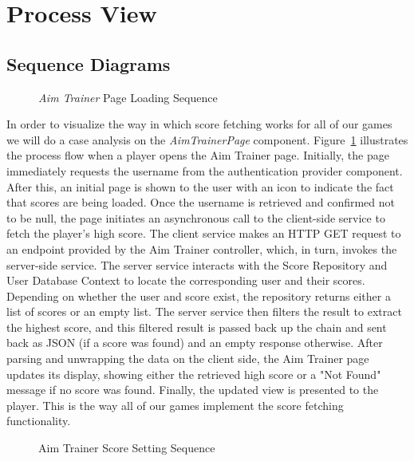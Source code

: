 \documentclass[11pt,a4paper]{article}
\newcommand{\inputdiagram}[1]{}
\begin{document}
\section{Process View}

\subsection{Sequence Diagrams}

\begin{figure}[H]
    \centering
     \begin{adjustbox}{width=0.92\paperwidth,center}
         \inputdiagram{aim_trainer_page_sequence.tex}
     \end{adjustbox}
     \caption{\textit{Aim Trainer} Page Loading Sequence}
    \label{fig:aim_trainer_page_sequence}
\end{figure}
In order to visualize the way in which score fetching works for all of
our games we will do a case analysis on the \textit{AimTrainerPage} component.
Figure~\ref{fig:aim_trainer_page_sequence} illustrates the process flow
when a player opens the Aim Trainer page. Initially, the page immediately
requests the username from the authentication provider component. After
this, an initial page is shown to the user with an icon to indicate the fact
that scores are being loaded. Once the username is retrieved and confirmed
not to be null, the page initiates an asynchronous call to the client-side
service to fetch the player's high score. The client service makes an HTTP GET
request to an endpoint provided by the Aim Trainer controller, which, in turn,
invokes the server-side service. The server service interacts with the Score
Repository and User Database Context to locate the corresponding user and
their scores. Depending on whether the user and score exist, the repository
returns either a list of scores or an empty list. The server service then
filters the result to extract the highest score, and this filtered result
is passed back up the chain and sent back as JSON (if a score was found)
and an empty response otherwise. After parsing and unwrapping the data on
the client side, the Aim Trainer page updates its display, showing either the
retrieved high score or a "Not Found" message if no score was found. Finally,
the updated view is presented to the player. This is the way all of our
games implement the score fetching functionality.

\begin{figure}[H]
    \centering
     \begin{adjustbox}{width=0.92\paperwidth,center}
        \inputdiagram{aim_trainer_set_score_sequence.tex}
     \end{adjustbox}
    \caption{Aim Trainer Score Setting Sequence}
    \label{fig:aim_trainer_set_score_sequence}
\end{figure}
\end{document}
